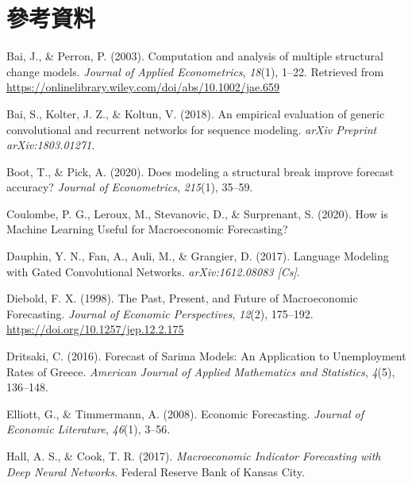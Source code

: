\documentclass[oneside]{book}
\let\oldhref=\href
\renewcommand{\href}[2]{#2\footnote{\url{#1}}}
\begin{document}
\renewcommand{\href}{\oldhref}

\hypertarget{references}{%
\chapter*{參考資料}\label{references}}

\hypertarget{refs}{}
\leavevmode\hypertarget{ref-baiComputationAnalysisMultiple2003}{}%
Bai, J., \& Perron, P. (2003). Computation and analysis of multiple structural change models. \emph{Journal of Applied Econometrics}, \emph{18}(1), 1--22. Retrieved from \url{https://onlinelibrary.wiley.com/doi/abs/10.1002/jae.659}

\leavevmode\hypertarget{ref-baiEmpiricalEvaluationGeneric2018}{}%
Bai, S., Kolter, J. Z., \& Koltun, V. (2018). An empirical evaluation of generic convolutional and recurrent networks for sequence modeling. \emph{arXiv Preprint arXiv:1803.01271}.

\leavevmode\hypertarget{ref-bootDoesModelingStructural2020}{}%
Boot, T., \& Pick, A. (2020). Does modeling a structural break improve forecast accuracy? \emph{Journal of Econometrics}, \emph{215}(1), 35--59.

\leavevmode\hypertarget{ref-coulombeHowMachineLearning2020}{}%
Coulombe, P. G., Leroux, M., Stevanovic, D., \& Surprenant, S. (2020). How is Machine Learning Useful for Macroeconomic Forecasting?

\leavevmode\hypertarget{ref-dauphinLanguageModelingGated2017}{}%
Dauphin, Y. N., Fan, A., Auli, M., \& Grangier, D. (2017). Language Modeling with Gated Convolutional Networks. \emph{arXiv:1612.08083 {[}Cs{]}}.

\leavevmode\hypertarget{ref-dieboldPresentFutureMacroeconomic1998}{}%
Diebold, F. X. (1998). The Past, Present, and Future of Macroeconomic Forecasting. \emph{Journal of Economic Perspectives}, \emph{12}(2), 175--192. \url{https://doi.org/10.1257/jep.12.2.175}

\leavevmode\hypertarget{ref-dritsakiForecastSarimaModels2016}{}%
Dritsaki, C. (2016). Forecast of Sarima Models: Αn Application to Unemployment Rates of Greece. \emph{American Journal of Applied Mathematics and Statistics}, \emph{4}(5), 136--148.

\leavevmode\hypertarget{ref-elliottEconomicForecasting2008}{}%
Elliott, G., \& Timmermann, A. (2008). Economic Forecasting. \emph{Journal of Economic Literature}, \emph{46}(1), 3--56.

\leavevmode\hypertarget{ref-hallMacroeconomicIndicatorForecasting2017}{}%
Hall, A. S., \& Cook, T. R. (2017). \emph{Macroeconomic Indicator Forecasting with Deep Neural Networks}. Federal Reserve Bank of Kansas City.
\end{document}
